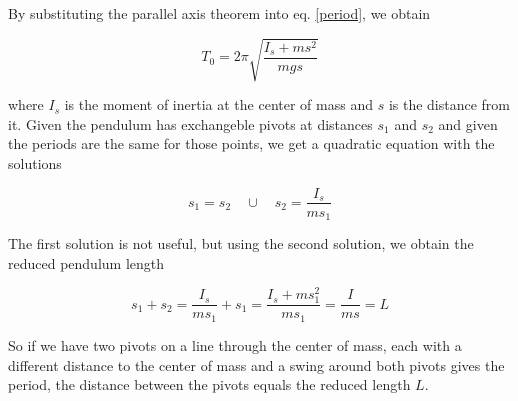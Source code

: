\documentclass[a4paper,german,12pt,smallheadings]{scrartcl}
\begin{document}
By substituting the parallel axis theorem into eq. \ref{period}, we obtain

\begin{equation}
  T_{0} = 2 \pi \sqrt{\frac{I_s + ms^2}{mgs}}
\end{equation}

where $I_s$ is the moment of inertia at the center of mass and $s$ is the
distance from it. Given the pendulum has exchangeble pivots at distances $s_1$
and $s_2$ and given the periods are the same for those points, we get a
quadratic equation with the solutions

\begin{equation}
  s_1 = s_2 \quad \cup \quad s_2 = \frac{I_s}{m s_1}
\end{equation}

The first solution is not useful, but using the second solution, we obtain the
reduced pendulum length

\begin{equation}
  s_1 + s_2 = \frac{I_s}{ms_1} + s_1 = \frac{I_s + ms_1^2}{ms_1} = \frac{I}{ms} = L
\end{equation}

So if we have two pivots on a line through the center of mass, each with a
different distance to the center of mass and a swing around both pivots gives
the period, the distance between the pivots equals the reduced length $L$.
\end{document}
